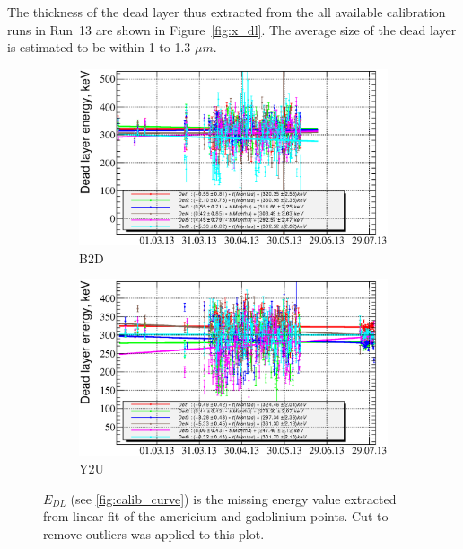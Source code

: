 \documentclass[a4paper,12pt]{article}
\begin{document}
The thickness of the dead layer thus extracted from the all available
calibration runs in Run~13 are shown in Figure~\ref{fig:x_dl}. The average size
of the dead layer is estimated to be within 1 to 1.3 $\mu m$.

\newcommand\edllabellabel{$E_{DL}$ (see \ref{fig:calib_curve}) is the missing 
energy value extracted from linear fit of the americium and gadolinium points.
Cut to remove outliers was applied to this plot.}
\begin{figure}[p]
\begin{subfigure}[b]{0.5\textwidth}
\includegraphics[width=\textwidth]{gfx/run13_alpha_study/B2D/c_chDeadLayerEnergy_by_day_B2D.eps}
\caption{B2D}
\end{subfigure}
%
\begin{subfigure}[b]{0.5\textwidth}
\includegraphics[width=\textwidth]{gfx/run13_alpha_study/Y2U/c_chDeadLayerEnergy_by_day_Y2U.eps}
\caption{Y2U}
\end{subfigure}
%
\caption{\edllabellabel}
\label{fig:e_dl}
\end{figure}
\end{document}
